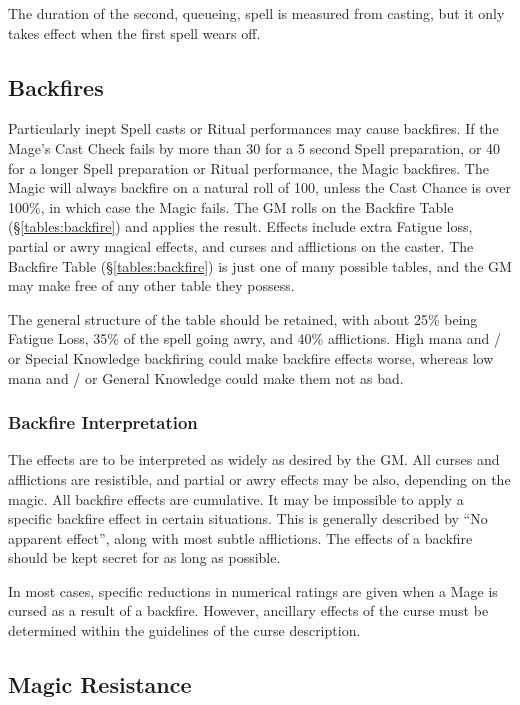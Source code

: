 \begin{multicols*}{3}
The duration of the second, queueing, spell is measured from casting,
but it only takes effect when the first spell wears off.

\subsection{Backfires}
\label{magic:backfire}

Particularly inept Spell casts or Ritual performances may cause
backfires. If the Mage's Cast Check fails by more than 30 for a 5
second Spell preparation, or 40 for a longer Spell preparation or
Ritual performance, the Magic backfires. The Magic will always
backfire on a natural roll of 100, unless the Cast Chance is over
100\%, in which case the Magic fails. The GM rolls on the Backfire
Table (\S\ref{tables:backfire}) and applies the result. Effects
include extra Fatigue loss, partial or awry magical effects, and
curses and afflictions on the caster. The Backfire Table
(\S\ref{tables:backfire}) is just one of many possible tables, and the
GM may make free of any other table they possess.

The general structure of the table should be retained, with about 25\%
being Fatigue Loss, 35\% of the spell going awry, and 40\%
afflictions.  High mana and / or Special Knowledge backfiring could
make backfire effects worse, whereas low mana and / or General
Knowledge could make them not as bad.

\subsubsection{Backfire Interpretation}

The effects are to be interpreted as widely as desired by the GM. All
curses and afflictions are resistible, and partial or awry effects may
be also, depending on the magic. All backfire effects are
cumulative. It may be impossible to apply a specific backfire effect
in certain situations. This is generally described by ``No apparent
effect'', along with most subtle afflictions. The effects of a
backfire should be kept secret for as long as possible.

In most cases, specific reductions in numerical ratings are given when
a Mage is cursed as a result of a backfire. However, ancillary effects
of the curse must be determined within the guidelines of the curse
description.

\subsection{Magic Resistance}
\label{magic:resistance}


\end{multicols*}
